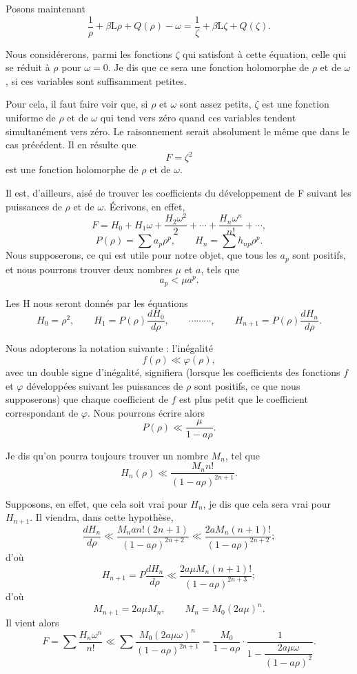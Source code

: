 \documentclass[11pt]{article}
\begin{document}
Posons maintenant
\begin{equation}\tag{5 bis}
\frac1\rho+\beta\mathrm L\rho+Q(\rho)-\omega
=\frac1\zeta+\beta\mathrm L\zeta+Q(\zeta).
\end{equation}

Nous considérerons, parmi les fonctions $\zeta$ qui satisfont à cette équation, celle qui se réduit à $\rho$ pour $\omega=0$. Je dis que ce sera une fonction holomorphe de $\rho$ et de $\omega$, si ces variables sont suffisamment petites.

Pour cela, il faut faire voir que, si $\rho$ et $\omega$ sont assez petits, $\zeta$ est une fonction uniforme de $\rho$ et de $\omega$ qui tend vers zéro quand ces variables tendent simultanément vers zéro. Le raisonnement serait absolument le même que dans le cas précédent. Il en résulte que
\[
F=\zeta^2
\]
est une fonction holomorphe de $\rho$ et de $\omega$.

Il est, d’ailleurs, aisé de trouver les coefficients du développement de F suivant les puissances de $\rho$ et de $\omega$. Écrivons, en effet,
\[
F=H_0+H_1\omega+\frac{H_2\omega^2}{2}+\cdots+\frac{H_n\omega^n}{n!}+\cdots,
\]
\[
P(\rho)=\sum a_p\rho^p,
\qquad
H_n=\sum h_{np}\rho^p.
\]
Nous supposerons, ce qui est utile pour notre objet, que tous les $a_p$ sont positifs, et nous pourrons trouver deux nombres $\mu$ et $a$, tels que
\[
a_p<\mu a^p.
\]

Les H nous seront donnés par les équations
\[
H_0=\rho^2,
\qquad
H_1=P(\rho)\frac{dH_0}{d\rho},
\qquad
\cdots\cdots\cdots,
\qquad
H_{n+1}=P(\rho)\frac{dH_n}{d\rho}.
\]

Nous adopterons la notation suivante : l’inégalité
\[
f(\rho)\ll\varphi(\rho),
\]
avec un double signe d’inégalité, signifiera (lorsque les coefficients des fonctions $f$ et $\varphi$ développées suivant les puissances de $\rho$ sont positifs, ce que nous supposerons) que chaque coefficient de $f$ est plus petit que le coefficient correspondant de $\varphi$. Nous pourrons écrire alors
\[
P(\rho)\ll\frac{\mu}{1-a\rho}.
\]

Je dis qu’on pourra toujours trouver un nombre $M_n$, tel que
\[
H_n(\rho)\ll\frac{M_n n!}{(1-a\rho)^{2n+1}}.
\]

Supposons, en effet, que cela soit vrai pour $H_n$, je dis que cela sera vrai pour $H_{n+1}$. Il viendra, dans cette hypothèse,
\[
\frac{dH_n}{d\rho}\ll
\frac{M_n a n!(2n+1)}{(1-a\rho)^{2n+2}}
\ll
\frac{2aM_n(n+1)!}{(1-a\rho)^{2n+2}};
\]
d’où
\[
H_{n+1}=P\frac{dH_n}{d\rho}
\ll
\frac{2a\mu M_n(n+1)!}{(1-a\rho)^{2n+3}};
\]
d’où
\[
M_{n+1}=2a\mu M_n,
\qquad
M_n=M_0(2a\mu)^n.
\]
Il vient alors
\[
F=\sum\frac{H_n\omega^n}{n!}
\ll
\sum\frac{M_0(2a\mu\omega)^n}{(1-a\rho)^{2n+1}}
=\frac{M_0}{1-a\rho}\cdot\frac{1}{1-\dfrac{2a\mu\omega}{(1-a\rho)^2}}.
\]
\end{document}
